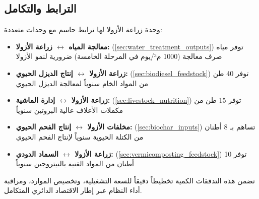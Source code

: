 \subsection{الترابط والتكامل}
وحدة زراعة الأزولا لها ترابط حاسم مع وحدات متعددة:

\begin{itemize}
    \item \textbf{معالجة المياه $\leftrightarrow$ زراعة الأزولا:} (\ref{sec:water_treatment_outputs}) توفر مياه صرف معالجة (1000 م³/يوم في المرحلة الخامسة) ضرورية لنمو الأزولا
    
    \item \textbf{زراعة الأزولا $\leftrightarrow$ إنتاج الديزل الحيوي:} (\ref{sec:biodiesel_feedstock}) توفر 40 طن من المواد الخام سنوياً لمعالجة الديزل الحيوي
    
    \item \textbf{زراعة الأزولا $\leftrightarrow$ إدارة الماشية:} (\ref{sec:livestock_nutrition}) توفر 15 طن من مكملات الأعلاف عالية البروتين سنوياً
    
    \item \textbf{مخلفات الأزولا $\leftrightarrow$ إنتاج الفحم الحيوي:} (\ref{sec:biochar_inputs}) تساهم بـ 8 أطنان من الكتلة الحيوية سنوياً لإنتاج الفحم الحيوي
    
    \item \textbf{زراعة الأزولا $\leftrightarrow$ السماد الدودي:} (\ref{sec:vermicomposting_feedstock}) توفر 10 أطنان من المواد الغنية بالنيتروجين سنوياً
\end{itemize}

تضمن هذه التدفقات الكمية تخطيطاً دقيقاً للسعة التشغيلية، وتخصيص الموارد، ومراقبة أداء النظام عبر إطار الاقتصاد الدائري المتكامل.
